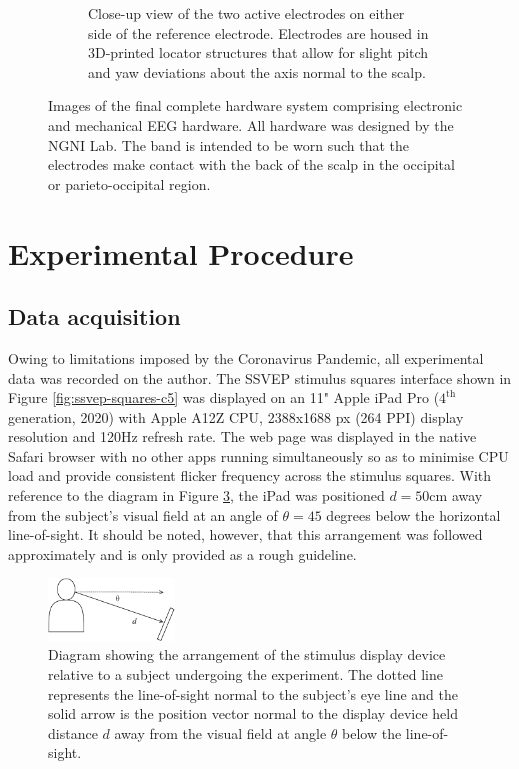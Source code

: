 \begin{figure}
\begin{subfigure}[c]{0.48\textwidth}
         \caption{Close-up view of the two active electrodes on either side of the reference electrode. Electrodes are housed in 3D-printed locator structures that allow for slight pitch and yaw deviations about the axis normal to the scalp.}
         \label{fig:final-headband-electrodes}
     \end{subfigure}
        \caption{Images of the final complete hardware system comprising electronic and mechanical EEG hardware. All hardware was designed by the NGNI Lab. The band is intended to be worn such that the electrodes make contact with the back of the scalp in the occipital or parieto-occipital region.}
        \label{fig:final-headband-subfigs}
\end{figure}

\section{Experimental Procedure}
\subsection{Data acquisition}
Owing to limitations imposed by the Coronavirus Pandemic, all experimental data was recorded on the author. The SSVEP stimulus squares interface shown in Figure \ref{fig:ssvep-squares-c5} was displayed on an 11" Apple iPad Pro ($4^{\textrm{th}}$ generation, 2020) with Apple A12Z CPU, 2388x1688 px (264 PPI) display resolution and 120Hz refresh rate. The web page was displayed in the native Safari browser with no other apps running simultaneously so as to minimise CPU load and provide consistent flicker frequency across the stimulus squares. With reference to the diagram in Figure \ref{fig:visual-setup-diagram}, the iPad was positioned $d=50$cm away from the subject's visual field at an angle of $\theta=45$ degrees below the horizontal line-of-sight. It should be noted, however, that this arrangement was followed approximately and is only provided as a rough guideline.

\begin{figure}[!htb]
    \centering
    \includegraphics[width=0.3\textwidth]{visual-setup-diagram}
    \caption[Diagram showing the arrangement of the stimulus display device relative to a subject undergoing the experiment]{Diagram showing the arrangement of the stimulus display device relative to a subject undergoing the experiment. The dotted line represents the line-of-sight normal to the subject's eye line and the solid arrow is the position vector normal to the display device held distance $d$ away from the visual field at angle $\theta$ below the line-of-sight.}
    \label{fig:visual-setup-diagram}
\end{figure}

